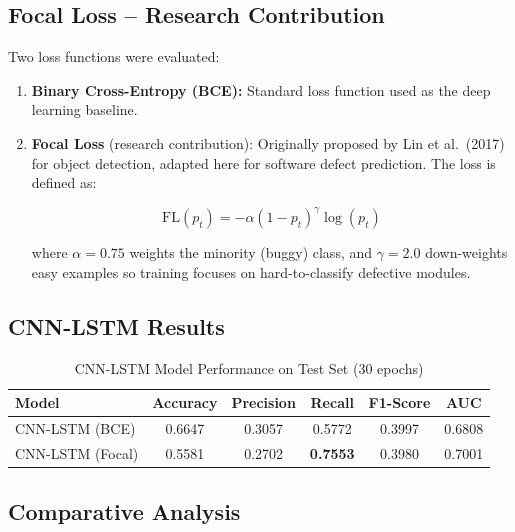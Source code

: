 \documentclass[12pt,a4paper]{article}
\begin{document}
\subsection{Focal Loss -- Research Contribution}

Two loss functions were evaluated:

\begin{enumerate}[leftmargin=1.5cm]
  \item \textbf{Binary Cross-Entropy (BCE):} Standard loss function
    used as the deep learning baseline.
  \item \textbf{Focal Loss} (research contribution): Originally
    proposed by Lin et al.\ (2017) for object detection, adapted here
    for software defect prediction. The loss is defined as:

    \begin{equation}
      \text{FL}(p_t) = -\alpha (1 - p_t)^{\gamma} \log(p_t)
    \end{equation}

    where $\alpha = 0.75$ weights the minority (buggy) class, and
    $\gamma = 2.0$ down-weights easy examples so training focuses on
    hard-to-classify defective modules.
\end{enumerate}

\subsection{CNN-LSTM Results}

\begin{table}[H]
  \centering
  \caption{CNN-LSTM Model Performance on Test Set (30 epochs)}
  \begin{tabular}{lccccc}
    \toprule
    \textbf{Model} & \textbf{Accuracy} & \textbf{Precision}
      & \textbf{Recall} & \textbf{F1-Score} & \textbf{AUC} \\
    \midrule
    CNN-LSTM (BCE)   & 0.6647 & 0.3057 & 0.5772 & 0.3997 & 0.6808 \\
    \rowcolor{lightgray}
    CNN-LSTM (Focal) & 0.5581 & 0.2702 & \textbf{0.7553} & 0.3980 & 0.7001 \\
    \bottomrule
  \end{tabular}
\end{table}

\subsection{Comparative Analysis}
\end{document}

